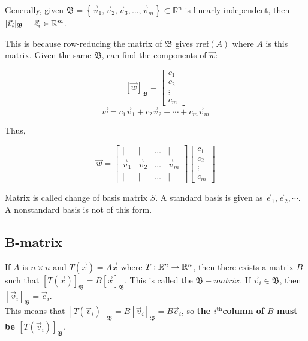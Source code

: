 \begin{framed}
\noindent
Generally, given $\mathfrak{B}=\left\{ \vec v_1, \vec v_2, \vec v_3, \dots, \vec v_m \right\}\subset \mathbb{R}^n$
is linearly independent, then $[\vec{v}_i]_{\mathfrak{B}}=\vec{e}_i\in\mathbb{R}^m$.
\end{framed}

This is because row-reducing the matrix of $\mathfrak{B}$ gives $\mathrm{rref}(A)$ where $A$ is this matrix. Given the same
$\mathfrak{B}$, can find the components of $\vec{w}$:

\[\left[\vec w \right]_\mathfrak{B}=\begin{bmatrix}c_1\\c_2\\ \vdots\\ c_m\end{bmatrix}\]
\[\vec{w}=c_{1} \vec{v}_{1}+c_{2} \vec{v}_{2}+\cdots+c_{m} \vec{v}_{m}\]

Thus,

\[\vec w = \begin{bmatrix}|&|&\dots&|\\ \vec v_1 &\vec v_2 & \dots &\vec v_m\\  |&|&\dots&| \end{bmatrix}\begin{bmatrix}c_1\\c_2\\\vdots\\c_m\end{bmatrix}\]

Matrix is called change of basis matrix $S$. A standard basis is given as $\vec{e}_1,\vec{e}_2,\cdots$. A nonstandard basis is not of this form.

\subsection{B-matrix}

If $A$ is $n\times n$ and $T(\vec{x})=A\vec{x}$ where $T:\mathbb{R}^n\rightarrow \mathbb{R}^n$, then there exists a matrix $B$ such that
$\left[T(\vec x)\right]_\mathfrak{B}=B\left[\vec x\right]_\mathfrak{B}$. This is called the $\mathfrak{B}-matrix$.
If $\vec{v}_i\in \mathfrak{B}$, then $[\vec{v}_i]_\mathfrak{B}=\vec{e}_i$.\\

\noindent
This means that 
$\left[T(\vec v_i)\right]_\mathfrak{B}=B\left[\vec v_i \right]_\mathfrak{B}=B\vec e_i$, so 
\textbf{the $i^{\mathrm{th}}$column of $B$ must be $[T(\vec{v}_i)]_\mathfrak{B}$}.\\

